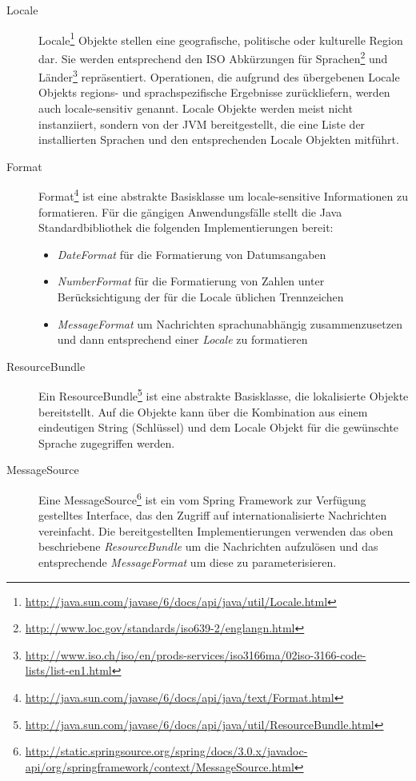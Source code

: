\begin{description}
\item[Locale]
Locale\footnote{\url{http://java.sun.com/javase/6/docs/api/java/util/Locale.html}}
Objekte stellen eine geografische, politische oder kulturelle Region dar. Sie
werden entsprechend den ISO Abkürzungen für
Sprachen\footnote{\url{http://www.loc.gov/standards/iso639-2/englangn.html}} und
Länder\footnote{\url{http://www.iso.ch/iso/en/prods-services/iso3166ma/02iso-3166-code-lists/list-en1.html}}
repräsentiert. Operationen, die aufgrund des übergebenen Locale Objekts regions-
und sprachspezifische Ergebnisse zurückliefern, werden auch locale-sensitiv
genannt. Locale Objekte werden meist nicht instanziiert, sondern von der
\ac{JVM} bereitgestellt, die eine Liste der installierten Sprachen und den entsprechenden
Locale Objekten mitführt.
\item[Format]
Format\footnote{\url{http://java.sun.com/javase/6/docs/api/java/text/Format.html}}
ist eine abstrakte Basisklasse um locale-sensitive Informationen zu formatieren.
Für die gängigen Anwendungsfälle stellt die Java Standardbibliothek die
folgenden Implementierungen bereit:
\begin{itemize}
  \item \emph{DateFormat} für die Formatierung von Datumsangaben
  \item \emph{NumberFormat} für die Formatierung von Zahlen unter
  Berücksichtigung der für die Locale üblichen Trennzeichen
  \item \emph{MessageFormat} um Nachrichten sprachunabhängig zusammenzusetzen
  und dann entsprechend einer \emph{Locale} zu formatieren
\end{itemize}
\item[ResourceBundle] Ein
ResourceBundle\footnote{\url{http://java.sun.com/javase/6/docs/api/java/util/ResourceBundle.html}}
ist eine abstrakte Basisklasse, die lokalisierte Objekte bereitstellt. Auf die
Objekte kann über die Kombination aus einem eindeutigen String (Schlüssel) und
dem Locale Objekt für die gewünschte Sprache zugegriffen werden.
\item[MessageSource] Eine
MessageSource\footnote{\url{http://static.springsource.org/spring/docs/3.0.x/javadoc-api/org/springframework/context/MessageSource.html}}
ist ein vom Spring Framework zur Verfügung gestelltes Interface, das den Zugriff
auf internationalisierte Nachrichten vereinfacht. Die bereitgestellten
Implementierungen verwenden das oben beschriebene \emph{ResourceBundle} um die
Nachrichten aufzulösen und das entsprechende \emph{MessageFormat} um diese zu
parameterisieren.
\end{description}

